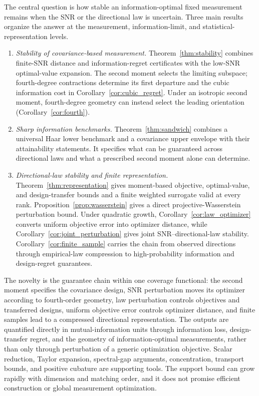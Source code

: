 \documentclass[lettersize,onecolumn]{IEEEtran}
\theoremstyle{remark}
\theoremstyle{definition}
\begin{document}
The central question is how stable an information-optimal fixed measurement remains when the SNR or the directional law is uncertain. Three main results organize the answer at the measurement, information-limit, and statistical-representation levels.
\begin{enumerate}
\item \emph{Stability of covariance-based measurement.} Theorem~\ref{thm:stability} combines finite-SNR distance and information-regret certificates with the low-SNR optimal-value expansion. The second moment selects the limiting subspace; fourth-degree contractions determine its first departure and the cubic information cost in Corollary~\ref{cor:cubic_regret}. Under an isotropic second moment, fourth-degree geometry can instead select the leading orientation (Corollary~\ref{cor:fourth}).
\item \emph{Sharp information benchmarks.} Theorem~\ref{thm:sandwich} combines a universal Haar lower benchmark and a covariance upper envelope with their attainability statements. It specifies what can be guaranteed across directional laws and what a prescribed second moment alone can determine.
\item \emph{Directional-law stability and finite representation.} Theorem~\ref{thm:representation} gives moment-based objective, optimal-value, and design-transfer bounds and a finite weighted surrogate valid at every rank. Proposition~\ref{prop:wasserstein} gives a direct projective-Wasserstein perturbation bound. Under quadratic growth, Corollary~\ref{cor:law_optimizer} converts uniform objective error into optimizer distance, while Corollary~\ref{cor:joint_perturbation} gives joint SNR--directional-law stability. Corollary~\ref{cor:finite_sample} carries the chain from observed directions through empirical-law compression to high-probability information and design-regret guarantees.
\end{enumerate}

The novelty is the guarantee chain within one coverage functional: the second moment specifies the covariance design, SNR perturbation moves its optimizer according to fourth-order geometry, law perturbation controls objectives and transferred designs, uniform objective error controls optimizer distance, and finite samples lead to a compressed directional representation. The outputs are quantified directly in mutual-information units through information loss, design-transfer regret, and the geometry of information-optimal measurements, rather than only through perturbation of a generic optimization objective. Scalar reduction, Taylor expansion, spectral-gap arguments, concentration, transport bounds, and positive cubature are supporting tools. The support bound can grow rapidly with dimension and matching order, and it does not promise efficient construction or global measurement optimization.
\end{document}
